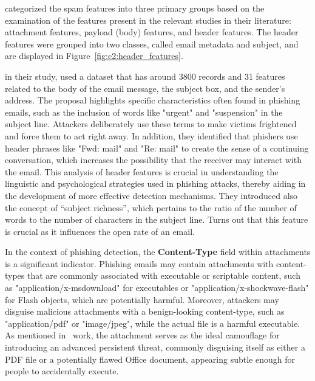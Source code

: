 
\citet{8257764} categorized the spam features into three primary groups based on the examination of the features present in the relevant studies in their literature: attachment features, payload (body) features, and header features. The header features were grouped into two classes, called email metadata and subject, and are displayed in Figure~\ref{fig:c2:header_features}.



\citet{Abadla202312} in their study, used a dataset that has around 3800 records and 31 features related to the body of the email message, the subject box, and the sender’s address.
The proposal highlights specific characteristics often found in phishing emails, such as the inclusion of words like "urgent" and "suspension" in the subject line. Attackers deliberately use these terms to make victims frightened and force them to act right away. In addition, they identified that phishers use header phrases like "Fwd: mail" and "Re: mail" to create the sense of a continuing conversation, which increases the possibility that the receiver may interact with the email. This analysis of header features is crucial in understanding the linguistic and psychological strategies used in phishing attacks, thereby aiding in the development of more effective detection mechanisms. They introduced also the concept of “subject richness”, which pertains to the ratio of the number of words to the number of characters in the subject line. Turns out that this feature is crucial as it influences the open rate of an email.

In the context of phishing detection, the \textbf{Content-Type} field within attachments is a significant indicator. 
Phishing emails may contain attachments with content-types that are commonly associated with executable or scriptable content, such as "application/x-msdownload" for executables or "application/x-shockwave-flash" for Flash objects, which are potentially harmful. Moreover, attackers may disguise malicious attachments with a benign-looking content-type, such as "application/pdf" or "image/jpeg", while the actual file is a harmful executable. As mentioned in~\citet{caldwell2013spear} work, the attachment serves as the ideal camouflage for introducing an advanced persistent threat, commonly disguising itself as either a PDF file or a potentially flawed Office document, appearing subtle enough for people to accidentally execute. 

